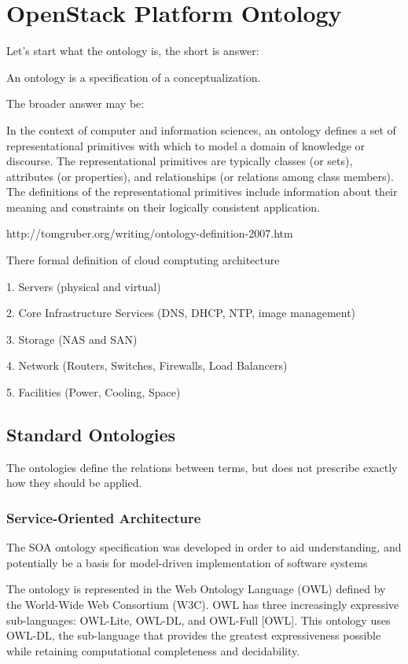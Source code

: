 
\section{OpenStack Platform Ontology}

Let's start what the ontology is, the short is answer:

    An ontology is a specification of a conceptualization. 

The broader answer may be:

	In the context of computer and information sciences, an ontology defines a set of representational primitives with which to model a domain of knowledge or discourse.  The representational primitives are typically classes (or sets), attributes (or properties), and relationships (or relations among class members). The definitions of the representational primitives include information about their meaning and constraints on their logically consistent application.


http://tomgruber.org/writing/ontology-definition-2007.htm


There formal definition of cloud comptuting architecture 

1. Servers (physical and virtual)

2. Core Infrastructure Services (DNS, DHCP, NTP, image management)

3. Storage (NAS and SAN)

4. Network (Routers, Switches, Firewalls, Load Balancers)

5. Facilities (Power, Cooling, Space)

\subsection{Standard Ontologies}

The ontologies define the relations between terms, but does not prescribe exactly how they should be applied. 

\subsubsection{Service-Oriented Architecture}

The SOA ontology specification was developed in order to aid understanding, and potentially be a basis for model-driven implementation of software systems

The ontology is represented in the Web Ontology Language (OWL) defined by the World-Wide Web Consortium (W3C). OWL has three increasingly expressive sub-languages: OWL-Lite, OWL-DL, and OWL-Full [OWL]. This ontology uses OWL-DL, the sub-language that provides the greatest expressiveness possible while retaining computational completeness and decidability.

